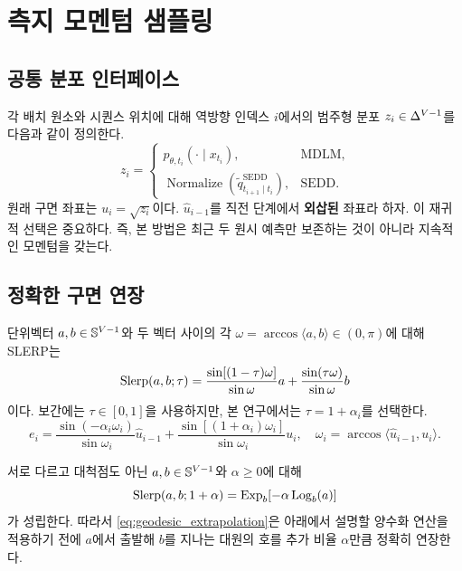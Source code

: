 \section{측지 모멘텀 샘플링}

\subsection{공통 분포 인터페이스}

각 배치 원소와 시퀀스 위치에 대해 역방향 인덱스 $i$에서의 범주형 분포
$z_i\in\Delta^{V-1}$를 다음과 같이 정의한다.
\begin{equation}
  z_i =
  \begin{cases}
    p_{\theta,t_i}(\cdot\mid x_{t_i}), & \text{MDLM},\\
    \operatorname{Normalize}(\widetilde q^{\mathrm{SEDD}}_{t_{i+1}\mid t_i}), & \text{SEDD}.
  \end{cases}
  \label{eq:common_distribution}
\end{equation}
원래 구면 좌표는 $u_i=\sqrt{z_i}$이다. $\widehat u_{i-1}$를 직전 단계에서 \textbf{외삽된}
좌표라 하자. 이 재귀적 선택은 중요하다. 즉, 본 방법은 최근 두 원시 예측만 보존하는 것이 아니라
지속적인 모멘텀을 갖는다.

\subsection{정확한 구면 연장}

단위벡터 $a,b\in\mathbb{S}^{V-1}$와 두 벡터 사이의 각
$\omega=\arccos\langle a,b\rangle\in(0,\pi)$에 대해 SLERP는 \citep{shoemake1985slerp}
\begin{equation}
  \operatorname{Slerp}(a,b;\tau)
  =\frac{\sin[(1-\tau)\omega]}{\sin\omega}a
   +\frac{\sin(\tau\omega)}{\sin\omega}b
  \label{eq:slerp}
\end{equation}
이다. 보간에는 $\tau\in[0,1]$을 사용하지만, 본 연구에서는 $\tau=1+\alpha_i$를 선택한다.
\begin{equation}
  e_i
  =\frac{\sin(-\alpha_i\omega_i)}{\sin\omega_i}\widehat u_{i-1}
   +\frac{\sin[(1+\alpha_i)\omega_i]}{\sin\omega_i}u_i,
  \quad
  \omega_i=\arccos\langle\widehat u_{i-1},u_i\rangle.
  \label{eq:geodesic_extrapolation}
\end{equation}

\begin{proposition}[지수사상 표현]
서로 다르고 대척점도 아닌 $a,b\in\mathbb{S}^{V-1}$와 $\alpha\ge 0$에 대해
\begin{equation}
  \operatorname{Slerp}(a,b;1+\alpha)
  =\operatorname{Exp}_b\!\left[-\alpha\operatorname{Log}_b(a)\right]
  \label{eq:exp_equivalence}
\end{equation}
가 성립한다. 따라서 \cref{eq:geodesic_extrapolation}은 아래에서 설명할 양수화 연산을 적용하기
전에 $a$에서 출발해 $b$를 지나는 대원의 호를 추가 비율 $\alpha$만큼 정확히 연장한다.
\end{proposition}

